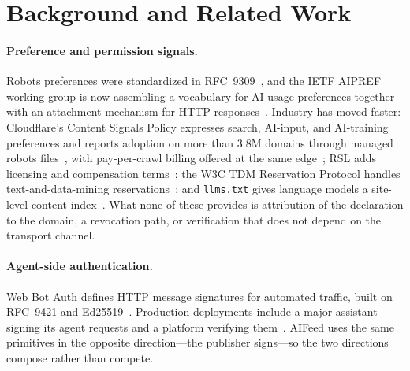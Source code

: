 \documentclass[11pt]{article}
\newcommand{\aifeed}{AIFeed}
\newcommand{\code}[1]{\texttt{#1}}
\begin{document}
\section{Background and Related Work}

\paragraph{Preference and permission signals.}
Robots preferences were standardized in RFC~9309~\citep{rfc9309}, and the IETF AIPREF
working group is now assembling a vocabulary for AI usage preferences together with an
attachment mechanism for HTTP responses~\citep{draftAiprefVocab,draftAiprefAttach}.
Industry has moved faster: Cloudflare's Content Signals Policy expresses search, AI-input,
and AI-training preferences and reports adoption on more than 3.8M domains through managed
robots files~\citep{cfContentSignals}, with pay-per-crawl billing offered at the same
edge~\citep{cfPayPerCrawl}; RSL adds licensing and compensation
terms~\citep{rsl}; the W3C TDM Reservation Protocol handles text-and-data-mining
reservations~\citep{tdmrep}; and \code{llms.txt} gives language models a site-level
content index~\citep{llmstxt}. What none of these provides is attribution of the
declaration to the domain, a revocation path, or verification that does not depend on the
transport channel.

\paragraph{Agent-side authentication.}
Web Bot Auth defines HTTP message signatures for automated traffic, built on RFC~9421 and
Ed25519~\citep{draftWebbotauth,draftWebbotArch,rfc9421,rfc8032}. Production deployments
include a major assistant signing its agent requests and a platform verifying
them~\citep{cfBotPrinciples}. \aifeed{} uses the same primitives in the opposite
direction---the publisher signs---so the two directions compose rather than compete.
\end{document}
